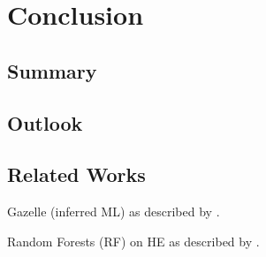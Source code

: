 \chapter{Conclusion}
\label{chap:conclusion}
\section{Summary}


\section{Outlook}

\section{Related Works}
Gazelle (inferred ML) as described by \cite{2018-gazelle}.

Random Forests (RF) on HE as described by \cite{2020-cryptotree}.
